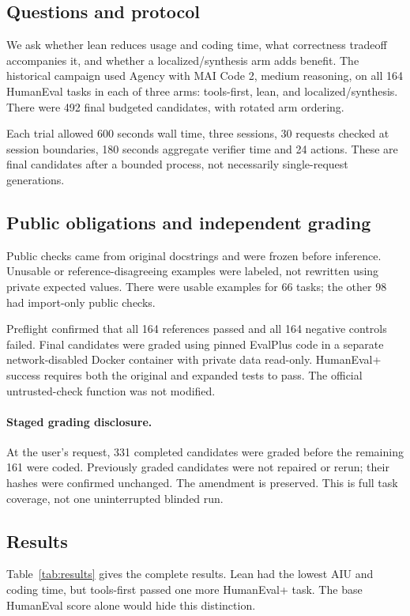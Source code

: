 \documentclass[10pt,twocolumn,a4paper]{article}
\begin{document}
\subsection{Questions and protocol}
We ask whether lean reduces usage and coding time, what correctness tradeoff
accompanies it, and whether a localized/synthesis arm adds benefit.
The historical campaign used Agency with MAI Code 2, medium reasoning,
on all 164 HumanEval tasks in each of three arms: tools-first, lean, and
localized/synthesis. There were 492 final budgeted candidates, with rotated
arm ordering.

Each trial allowed 600 seconds wall time, three sessions, 30 requests checked
at session boundaries, 180 seconds aggregate verifier time and 24 actions.
These are final candidates after a bounded process, not necessarily
single-request generations.

\subsection{Public obligations and independent grading}
Public checks came from original docstrings and were frozen before inference.
Unusable or reference-disagreeing examples were labeled, not rewritten using
private expected values. There were usable examples for 66 tasks; the other
98 had import-only public checks.

Preflight confirmed that all 164 references passed and all 164 negative
controls failed. Final candidates were graded using pinned EvalPlus code in
a separate network-disabled Docker container with private data read-only.
HumanEval+ success requires both the original and expanded tests to pass.
The official untrusted-check function was not modified.

\paragraph{Staged grading disclosure.}
At the user's request, 331 completed candidates were graded before the
remaining 161 were coded. Previously graded candidates were not repaired
or rerun; their hashes were confirmed unchanged. The amendment is preserved.
This is full task coverage, not one uninterrupted blinded run.

\subsection{Results}
Table~\ref{tab:results} gives the complete results. Lean had the lowest AIU
and coding time, but tools-first passed one more HumanEval+ task.
The base HumanEval score alone would hide this distinction.
\end{document}
